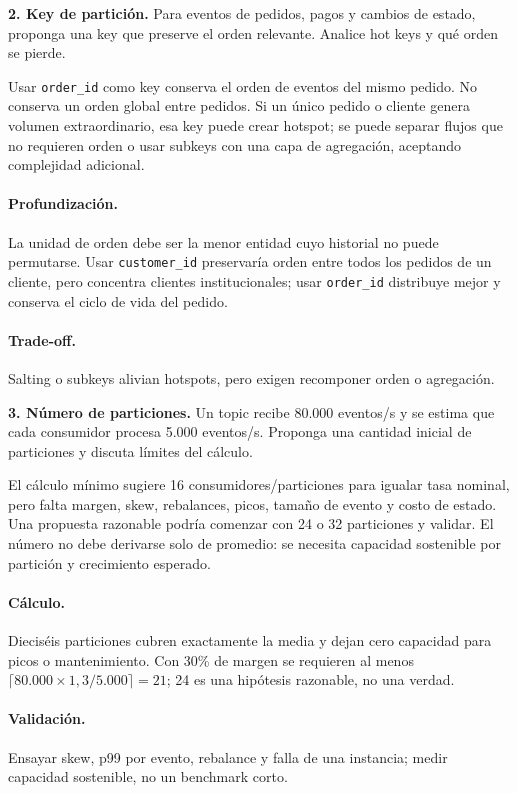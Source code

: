 \documentclass[variant=guiaresuelta,cover=institutional,mode=screen]{ua-engineering-v6-article}
\begin{document}
\begin{uaexercise}
\textbf{2. Key de partición.} Para eventos de pedidos, pagos y cambios de estado, proponga una key que preserve el orden relevante. Analice hot keys y qué orden se pierde.
\end{uaexercise}
\begin{uaanswer}
Usar \texttt{order\_id} como key conserva el orden de eventos del mismo pedido. No conserva un orden global entre pedidos. Si un único pedido o cliente genera volumen extraordinario, esa key puede crear hotspot; se puede separar flujos que no requieren orden o usar subkeys con una capa de agregación, aceptando complejidad adicional.

\paragraph{Profundización.} La unidad de orden debe ser la menor entidad cuyo historial no puede permutarse. Usar \texttt{customer\_id} preservaría orden entre todos los pedidos de un cliente, pero concentra clientes institucionales; usar \texttt{order\_id} distribuye mejor y conserva el ciclo de vida del pedido.\paragraph{Trade-off.} Salting o subkeys alivian hotspots, pero exigen recomponer orden o agregación.
\end{uaanswer}
\begin{uaexercise}
\textbf{3. Número de particiones.} Un topic recibe 80.000 eventos/s y se estima que cada consumidor procesa 5.000 eventos/s. Proponga una cantidad inicial de particiones y discuta límites del cálculo.
\end{uaexercise}
\begin{uaanswer}
El cálculo mínimo sugiere 16 consumidores/particiones para igualar tasa nominal, pero falta margen, skew, rebalances, picos, tamaño de evento y costo de estado. Una propuesta razonable podría comenzar con 24 o 32 particiones y validar. El número no debe derivarse solo de promedio: se necesita capacidad sostenible por partición y crecimiento esperado.

\paragraph{Cálculo.} Dieciséis particiones cubren exactamente la media y dejan cero capacidad para picos o mantenimiento. Con 30\% de margen se requieren al menos $\lceil 80.000\times1{,}3/5.000\rceil=21$; 24 es una hipótesis razonable, no una verdad.\paragraph{Validación.} Ensayar skew, p99 por evento, rebalance y falla de una instancia; medir capacidad sostenible, no un benchmark corto.
\end{uaanswer}
\end{document}
